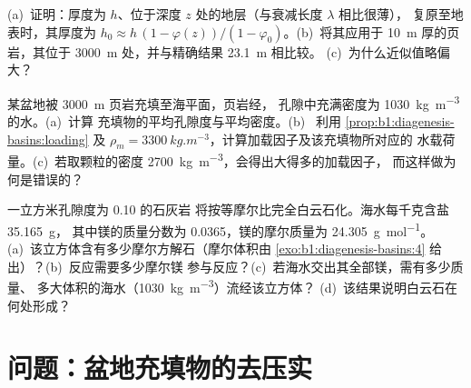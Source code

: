 \begin{exercise}[$\star\star\star$]\label{exo:b1:diagenesis-basins:10}
(a)~证明：厚度为 $h$、位于深度 $z$ 处的地层（与衰减长度 $\lambda$ 相比很薄），
复原至地表时，其厚度为 $h_0 \approx h\,(1 - \varphi(z))/(1 -
\varphi_0)$。(b)~将其应用于 \qty{10}{m} 厚的页岩，其位于
\qty{3000}{m} 处，并与精确结果 \qty{23.1}{m} 相比较。
(c)~为什么近似值略偏大？
\end{exercise}

\begin{exercise}[$\star\star\star$]\label{exo:b1:diagenesis-basins:11}
某盆地被 \qty{3000}{m} 页岩充填至海平面，页岩经，
孔隙中充满密度为 \qty{1030}{kg.m^{-3}} 的水。(a)~计算
充填物的平均孔隙度与平均密度。(b)~
利用 \cref{prop:b1:diagenesis-basins:loading} 及 $\rho_m =
\qty{3300}{kg.m^{-3}}$，计算加载因子及该充填物所对应的
水载荷量。(c)~若取颗粒的密度
\qty{2700}{kg.m^{-3}}，会得出大得多的加载因子，
而这样做为何是错误的？
\end{exercise}

\begin{exercise}[$\star\star\star$]\label{exo:b1:diagenesis-basins:12}
一立方米孔隙度为 \num{0.10} 的石灰岩
将按等摩尔比完全白云石化。海水每千克含盐 \qty{35.165}{g}，
其中镁的质量分数为 \num{0.0365}，镁的摩尔质量为 \qty{24.305}{g.mol^{-1}}。
(a)~该立方体含有多少摩尔方解石（摩尔体积由
\cref{exo:b1:diagenesis-basins:4} 给出）？(b)~反应需要多少摩尔镁
参与反应？(c)~若海水交出其全部镁，需有多少质量、
多大体积的海水（\qty{1030}{kg.m^{-3}}）流经该立方体？
(d)~该结果说明白云石在何处形成？
\end{exercise}

\section{问题：盆地充填物的去压实}

